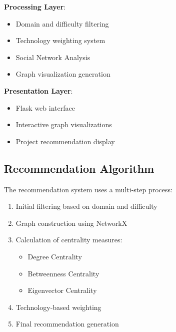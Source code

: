 \textbf{Processing Layer}:
\begin{itemize}
    \item Domain and difficulty filtering
    \item Technology weighting system
    \item Social Network Analysis
    \item Graph visualization generation
\end{itemize}

\textbf{Presentation Layer}:
\begin{itemize}
    \item Flask web interface
    \item Interactive graph visualizations
    \item Project recommendation display
\end{itemize}

\subsection{Recommendation Algorithm}
The recommendation system uses a multi-step process:
\begin{enumerate}
    \item Initial filtering based on domain and difficulty
    \item Graph construction using NetworkX
    \item Calculation of centrality measures:
    \begin{itemize}
        \item Degree Centrality
        \item Betweenness Centrality
        \item Eigenvector Centrality
    \end{itemize}
    \item Technology-based weighting
    \item Final recommendation generation
\end{enumerate}
